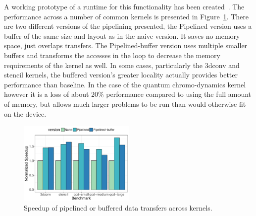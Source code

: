 A working prototype of a runtime for this functionality has been
created~\cite{cui2017directive}. The performance across a number of common
kernels is presented in Figure~\ref{fig:pipeline-perf}.  There are two different
versions of the pipelining presented, the Pipelined version uses a buffer of the
same size and layout as in the naive version.  It saves no memory space, just
overlaps transfers.  The Pipelined-buffer version uses multiple smaller buffers
and transforms the accesses in the loop to decrease the memory requirements of
the kernel as well.  In some cases, particularly the 3dconv and stencil kernels,
the buffered version's greater locality actually provides better performance
than baseline. In the case of the quantum chromo-dynamics kernel however it is a
loss of about 20\% performance compared to using the full amount of memory, but
allows much larger problems to be run than would otherwise fit on the device.

\begin{figure}
  \centering
  \includegraphics[width=0.5\textwidth]{pics/pipelining-perf}
  \caption{Speedup of pipelined or buffered data transfers across
  kernels.\label{fig:pipeline-perf}}
\end{figure}

